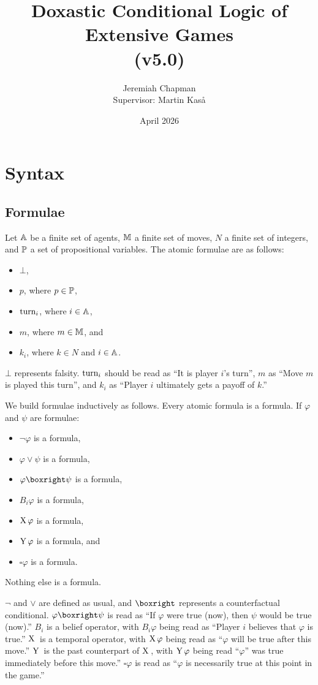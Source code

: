 \documentclass{article}
\title{Doxastic Conditional Logic of Extensive Games\\
(v5.0)}
\author{Jeremiah Chapman\\ Supervisor: Martin Kaså}
\affil{University of Gothenburg}
\date{April 2026}
\begin{document}


\maketitle
\section{Syntax}
\subsection{Formulae}
Let $\mathbb{A}$ be a finite set of agents, $\mathbb{M}$ a finite set of moves, $N$ a finite set of integers, and $\mathbb{P}$ a set of propositional variables. The atomic formulae are as follows:
\begin{itemize}
    \item $\bot$,
    \item $p$, where $p\in\mathbb{P}$,
    \item $\text{turn}_i$, where $i\in\mathbb{A}$,
    \item $m$, where $m\in\mathbb{M}$, and
    \item $k_i$, where $k\in N$ and $i\in\mathbb{A}$.
\end{itemize}
$\bot$ represents falsity. $\text{turn}_i$ should be read as ``It is player $i$'s turn'', $m$ as ``Move $m$ is played this turn'', and $k_i$ as ``Player $i$ ultimately gets a payoff of $k$.'' 

We build formulae inductively as follows. Every atomic formula is a formula. If $\varphi$ and $\psi$ are formulae: 
\begin{itemize}
    \item $\lnot\varphi$ is a formula,
    \item $\varphi\lor\psi$ is a formula,
    \item $\varphi\boxright\psi$ is a formula,
    \item $B_i\varphi$ is a formula,
    \item $\text{X}\,\varphi$ is a formula,
    \item $\text{Y}\,\varphi$ is a formula, and
    \item $\square\varphi$ is a formula.
\end{itemize}
Nothing else is a formula.

$\lnot$ and $\lor$ are defined as usual, and $\boxright$ represents a counterfactual conditional. $\varphi\boxright\psi$ is read as ``If $\varphi$ were true (now), then $\psi$ would be true (now).'' $B_i$ is a belief operator, with $B_i\varphi$ being read as ``Player $i$ believes that $\varphi$ is true.'' $\text{X}\,$ is a temporal operator, with $\text{X}\,\varphi$ being read as ``$\varphi$ will be true after this move.'' $\text{Y}\,$ is the past counterpart of $\text{X}\,$, with $\text{Y}\,\varphi$ being read ``$\varphi$'' was true immediately before this move.'' $\square\varphi$ is read as ``$\varphi$ is necessarily true at this point in the game.''
\end{document}
